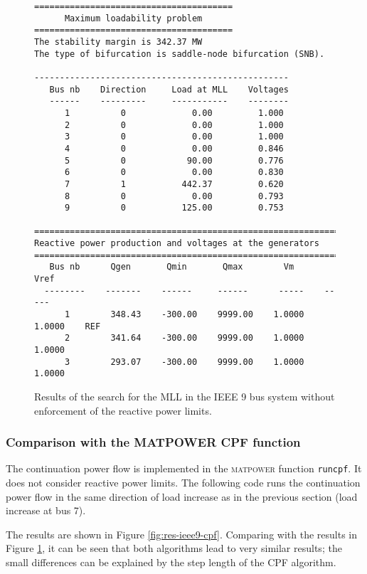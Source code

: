 \documentclass[12pt,a4]{article}
\newcommand*{\codemat}[1]{\texttt{#1}}
\newcommand*{\matpower}{\textsc{matpower} }
\begin{document}
\begin{figure}[!hb]
  \centering
\begin{verbatim}
=======================================
      Maximum loadability problem
=======================================
The stability margin is 342.37 MW
The type of bifurcation is saddle-node bifurcation (SNB).

--------------------------------------------------
   Bus nb    Direction     Load at MLL    Voltages 
   ------    ---------     -----------    --------
      1          0             0.00         1.000
      2          0             0.00         1.000
      3          0             0.00         1.000
      4          0             0.00         0.846
      5          0            90.00         0.776
      6          0             0.00         0.830
      7          1           442.37         0.620
      8          0             0.00         0.793
      9          0           125.00         0.753

=============================================================
Reactive power production and voltages at the generators
=============================================================
   Bus nb      Qgen       Qmin       Qmax        Vm      Vref
  --------    -------    ------     ------      -----    -----
      1        348.43    -300.00    9999.00    1.0000   1.0000    REF
      2        341.64    -300.00    9999.00    1.0000   1.0000
      3        293.07    -300.00    9999.00    1.0000   1.0000
\end{verbatim}  
  \caption{Results of the search for the MLL in the IEEE 9 bus system without enforcement of the reactive power limits.}\label{fig:res-ieee9-noQ}
\end{figure}

\subsubsection{Comparison with the MATPOWER CPF function}
\label{sec:comp-with-matp}

The continuation power flow is implemented in the \matpower function \codemat{runcpf}.
It does not consider reactive power limits.
The following code runs the continuation power flow in the same direction of load increase as in the previous section (load increase at bus 7).



The results are shown in Figure \ref{fig:res-ieee9-cpf}.
Comparing with the results in Figure \ref{fig:res-ieee9-noQ}, it can be seen that both algorithms lead to very similar results; the small differences can be explained by the step length of the CPF algorithm.
\end{document}
